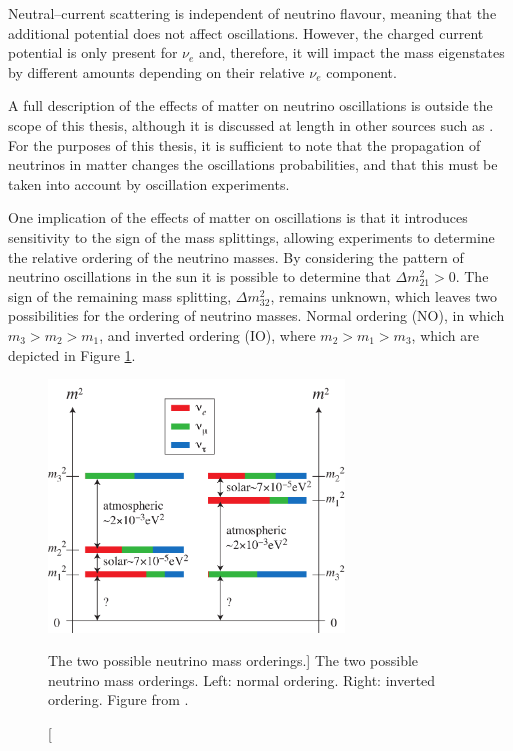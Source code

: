 Neutral--current scattering is independent of neutrino flavour, meaning that
the additional potential does not affect oscillations. However, the charged
current potential is only present for $\nu_e$ and, therefore, it will impact the
mass eigenstates by different amounts depending on their relative $\nu_e$
component.

A full description of the effects of matter on neutrino oscillations is outside
the scope of this thesis, although it is discussed at length in other sources
such as \cite{GiuntiCarlo2007FoNP}. For the purposes of this thesis, it is
sufficient to note that the propagation of neutrinos in matter changes the
oscillations probabilities, and that this must be taken into account by 
oscillation experiments.

One implication of the effects of matter on oscillations is that it introduces
sensitivity to the sign of the mass splittings\cite{GiuntiCarlo2007FoNP}, 
allowing experiments to determine the relative ordering of the neutrino 
masses. By considering the pattern of neutrino oscillations in the sun it is 
possible to determine that $\Delta m_{21}^2 > 0$\cite{PhysRevD.98.030001}. 
The sign of the remaining mass splitting, $\Delta m_{32}^2$, remains unknown,
which leaves two possibilities for the ordering of neutrino masses. Normal 
ordering (NO), in which $m_3 > m_2 > m_1$, and inverted ordering (IO), where $m_2 > m_1 
> m_3$, which are depicted in Figure \ref{fig:mass_ordering}. 
\begin{figure}
	\centering
	\includegraphics[width=0.7\textwidth]{figures/mass.pdf}
	\caption
	[The two possible neutrino mass orderings.]
	{The two possible neutrino mass orderings. Left: normal ordering. Right: 
	inverted ordering.  Figure from \cite{SKing}.}
	\label{fig:mass_ordering}
\end{figure}

